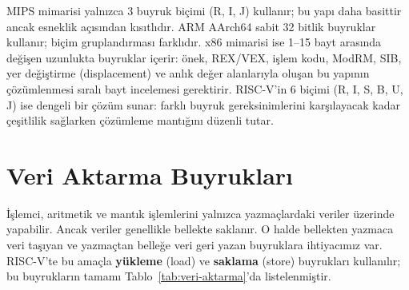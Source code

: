 \begin{karsilastirma}
MIPS mimarisi yalnızca 3 buyruk biçimi (R, I, J) kullanır; bu yapı daha basittir ancak esneklik açısından kısıtlıdır. ARM AArch64 sabit 32 bitlik buyruklar kullanır; biçim gruplandırması farklıdır. x86 mimarisi ise 1–15 bayt arasında değişen uzunlukta buyruklar içerir: önek, REX/VEX, işlem kodu, ModRM, SIB, yer değiştirme (displacement) ve anlık değer alanlarıyla oluşan bu yapının çözümlenmesi sıralı bayt incelemesi gerektirir. RISC-V'in 6 biçimi (R, I, S, B, U, J) ise dengeli bir çözüm sunar: farklı buyruk gereksinimlerini karşılayacak kadar çeşitlilik sağlarken çözümleme mantığını düzenli tutar.
\end{karsilastirma}

\section{Veri Aktarma Buyrukları}
\label{sec:veri-aktarma}

İşlemci, aritmetik ve mantık işlemlerini yalnızca yazmaçlardaki veriler üzerinde yapabilir. Ancak veriler genellikle bellekte saklanır. O halde bellekten yazmaca veri taşıyan ve yazmaçtan belleğe veri geri yazan buyruklara ihtiyacımız var. RISC-V'te bu amaçla \textbf{yükleme} (load) ve \textbf{saklama} (store) buyrukları kullanılır; bu buyrukların tamamı Tablo~\ref{tab:veri-aktarma}'da listelenmiştir.


